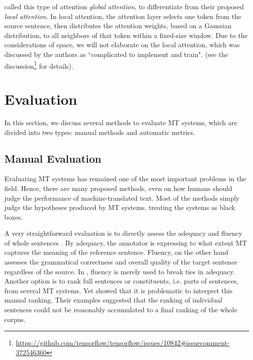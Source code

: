 \cite{DBLP:conf/emnlp/LuongPM15} called this type of attention \textit{global attention}, to differentiate from their proposed \textit{local attention}.
In local attention, the attention layer selects one token from the source sentence, then distributes the attention weights, based on a Gaussian distribution, to all neighbors of that token within a fixed-size window.
Due to the considerations of space, we will not elaborate on the local attention, which was discussed by the authors as ``complicated to implement and train".
(see the discussion\footnote{\url{https://github.com/tensorflow/tensorflow/issues/10842\#issuecomment-372546360}} for details).

\section{Evaluation}
\label{the-eval}

In this section, we discuss several methods to evaluate MT systems, which are divided into two types: manual methods and automatic metrics.

\subsection{Manual Evaluation}
\label{the-eval-manual}
Evaluating MT systems has remained one of the most important problems in the field.
Hence, there are many proposed methods, even on how humans should judge the performance of machine-translated text.
Most of the methods simply judge the hypotheses produced by MT systems, treating the systems as black boxes.

A very straightforward evaluation is to directly assess the adequacy and fluency of whole sentences \citep{DBLP:conf/acllaw/GrahamBMZ13}.
By adequacy, the annotator is expressing to what extent MT captures the meaning of the reference sentence.
Fluency, on the other hand assesses the grammatical correctness and overall quality of the target sentence regardless of the source.
In \citet{DBLP:conf/acllaw/GrahamBMZ13}, fluency is merely used to break ties in adequacy.
Another option is to rank full sentences or constituents, i.e. parts of sentences, from several MT systems.
Yet \cite{DBLP:conf/wmt/BojarEPZ11} showed that it is problematic to interpret this manual ranking.
Their examples suggested that the ranking of individual sentences could not be reasonably accumulated to a final ranking of the whole corpus.



